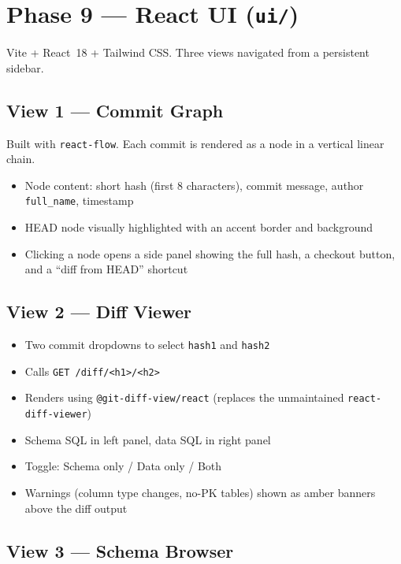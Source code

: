 \documentclass[12pt, a4paper]{article}
\begin{document}
\section{Phase 9 --- React UI (\texttt{ui/})}

Vite + React~18 + Tailwind CSS. Three views navigated from a persistent
sidebar.

\subsection{View 1 --- Commit Graph}

Built with \texttt{react-flow}. Each commit is rendered as a node in a
vertical linear chain.

\begin{itemize}[leftmargin=1.5em, itemsep=0.3em]
    \item Node content: short hash (first 8 characters), commit message,
    author \texttt{full\_name}, timestamp
    \item HEAD node visually highlighted with an accent border and background
    \item Clicking a node opens a side panel showing the full hash, a checkout
    button, and a ``diff from HEAD'' shortcut
\end{itemize}

\subsection{View 2 --- Diff Viewer}

\begin{itemize}[leftmargin=1.5em, itemsep=0.3em]
    \item Two commit dropdowns to select \texttt{hash1} and \texttt{hash2}
    \item Calls \texttt{GET /diff/<h1>/<h2>}
    \item Renders using \texttt{@git-diff-view/react} (replaces the
    unmaintained \texttt{react-diff-viewer})
    \item Schema SQL in left panel, data SQL in right panel
    \item Toggle: Schema only / Data only / Both
    \item Warnings (column type changes, no-PK tables) shown as amber banners
    above the diff output
\end{itemize}

\subsection{View 3 --- Schema Browser}
\end{document}
